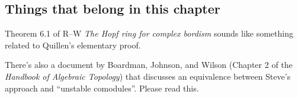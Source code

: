 \subsection*{Things that belong in this chapter}

Theorem 6.1 of R--W \textit{The Hopf ring for complex bordism} sounds like something related to Quillen's elementary proof.

There's also a document by Boardman, Johnson, and Wilson (Chapter 2 of the \textit{Handbook of Algebraic Topology}) that discusses an equivalence between Steve's approach and ``unstable comodules''.  Please read this.





